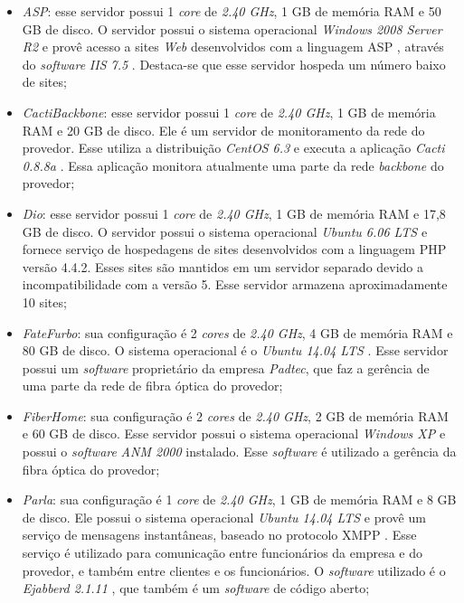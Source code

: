 \begin{itemize}
 \item \textit{ASP}: esse servidor possui 1 \textit{core} de \textit{2.40 GHz}, 1 GB de memória \ac{RAM} e 50 GB de disco. 
 O servidor possui o sistema operacional \textit{Windows 2008 Server R2} e provê acesso a sites \textit{Web} desenvolvidos com a linguagem 
 \ac{ASP} \cite{asp}, através do \textit{software} \textit{\ac{IIS} 7.5} \cite{iis}. Destaca-se que esse servidor hospeda um número baixo de sites;
 
 \item \textit{CactiBackbone}: esse servidor possui 1 \textit{core} de \textit{2.40 GHz}, 1 GB de memória \ac{RAM} e 20 GB de disco. 
 Ele é um servidor de monitoramento da rede do provedor. Esse utiliza a distribuição \textit{CentOS 6.3} \cite{centos} e executa a aplicação 
 \textit{Cacti 0.8.8a} \cite{cacti}. Essa aplicação monitora atualmente uma parte da rede \textit{backbone} do provedor;
 
 \item \textit{Dio}: esse servidor possui 1 \textit{core} de \textit{2.40 GHz}, 1 GB de memória \ac{RAM} e 17,8 GB de disco. 
 O servidor possui o sistema operacional \textit{Ubuntu 6.06 \ac{LTS}} \cite{ubuntu} e fornece serviço de hospedagens de sites desenvolvidos com 
 a linguagem \ac{PHP} versão 4.4.2. Esses sites são mantidos em um servidor separado devido a incompatibilidade com a versão 5. Esse servidor 
 armazena aproximadamente 10 sites;
 
 \item \textit{FateFurbo}: sua configuração é 2 \textit{cores} de \textit{2.40 GHz}, 4 GB de memória \ac{RAM} e 80 GB de disco. 
 O sistema operacional é o \textit{Ubuntu 14.04 \ac{LTS}} \cite{ubuntu}. Esse servidor possui um \textit{software} proprietário da empresa 
 \textit{Padtec}, que faz a gerência de uma parte da rede de fibra óptica do provedor;
 
 \item \textit{FiberHome}: sua configuração é 2 \textit{cores} de \textit{2.40 GHz}, 2 GB de memória \ac{RAM} e 60 GB de disco. 
 Esse servidor possui o sistema operacional \textit{Windows XP} e possui o \textit{software} \textit{ANM 2000} instalado. Esse \textit{software} 
 é utilizado a gerência da fibra óptica do provedor;
 
 \item \textit{Parla}: sua configuração é 1 \textit{core} de \textit{2.40 GHz}, 1 GB de memória \ac{RAM} e 8 GB de disco. 
 Ele possui o sistema operacional \textit{Ubuntu 14.04 \ac{LTS}} \cite{ubuntu} e provê um serviço de mensagens instantâneas, baseado no protocolo 
 \ac{XMPP} \cite{xmpp}. Esse serviço é utilizado para comunicação entre funcionários da empresa e do provedor, e também entre clientes e 
 os funcionários. O \textit{software} utilizado é o \textit{Ejabberd 2.1.11} \cite{ejabberd}, que também é um \textit{software} de código aberto;


\end{itemize}
